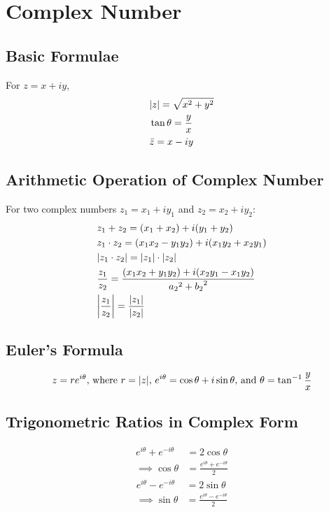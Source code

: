 \chapter{Complex Number}
\section{Basic Formulae}
For $z=x+iy$,
\begin{align}
	&\lvert z\rvert = \sqrt{x^2+y^2}\\
	&\tan \theta = \frac{y}{x}\\
	&\bar{z} = x - iy
\end{align}


\section{Arithmetic Operation of Complex Number}
For two complex numbers $z_1=x_1+iy_1$ and $z_2=x_2+iy_2$:
\begin{align}
	&z_1+z_2=(x_1+x_2)+i(y_1+y_2)\\
	&z_1 \cdot z_2=(x_1x_2-y_1y_2)+i(x_1y_2+x_2y_1)\\
	&\abs{z_1\cdot z_2} = \abs{z_1} \cdot \abs{z_2}\\
	&\frac{z_1}{z_2}=\frac{(x_1x_2+y_1y_2)+i(x_2y_1-x_1y_2)}{{a_2}^2+{b_2}^2}\\
	&\abs*{\frac{z_1}{z_2}} = \frac{\abs{z_1}}{\abs{z_2}}
\end{align}


\section{Euler's Formula}
\begin{equation}
	z=re^{i\theta}\text{, where $r= \lvert z\rvert$, $e^{i\theta}=\cos \theta + i \sin \theta$, and $\theta=\tan^{-1}\frac{y}{x}$}
\end{equation}


\section{Trigonometric Ratios in Complex Form}
\begin{align}
	e^{i\theta}+e^{-i\theta} &= 2\cos\theta\\
	\implies \cos \theta &= \frac{e^{i\theta}+e^{-i\theta}}{2}
\end{align}
\begin{align}
	e^{i\theta}-e^{-i\theta} &= 2\sin\theta\\
	\implies \sin \theta &= \frac{e^{i\theta}-e^{-i\theta}}{2}
\end{align}


